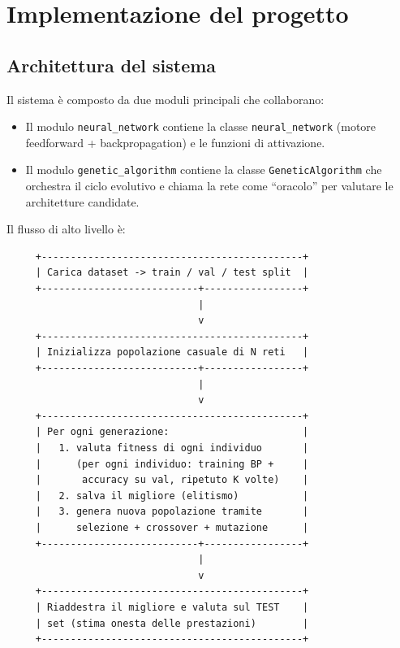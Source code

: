\documentclass[11pt,a4paper]{article}
\begin{document}
\newpage

\section{Implementazione del progetto}

\subsection{Architettura del sistema}

Il sistema è composto da due moduli principali che collaborano:

\begin{itemize}
    \item Il modulo \texttt{neural\_network} contiene la classe
          \texttt{neural\_network} (motore feedforward + backpropagation)
          e le funzioni di attivazione.
    \item Il modulo \texttt{genetic\_algorithm} contiene la classe
          \texttt{GeneticAlgorithm} che orchestra il ciclo evolutivo e
          chiama la rete come ``oracolo'' per valutare le architetture
          candidate.
\end{itemize}

Il flusso di alto livello è:

\begin{verbatim}
     +---------------------------------------------+
     | Carica dataset -> train / val / test split  |
     +---------------------------+-----------------+
                                 |
                                 v
     +---------------------------------------------+
     | Inizializza popolazione casuale di N reti   |
     +---------------------------+-----------------+
                                 |
                                 v
     +---------------------------------------------+
     | Per ogni generazione:                       |
     |   1. valuta fitness di ogni individuo       |
     |      (per ogni individuo: training BP +     |
     |       accuracy su val, ripetuto K volte)    |
     |   2. salva il migliore (elitismo)           |
     |   3. genera nuova popolazione tramite       |
     |      selezione + crossover + mutazione      |
     +---------------------------+-----------------+
                                 |
                                 v
     +---------------------------------------------+
     | Riaddestra il migliore e valuta sul TEST    |
     | set (stima onesta delle prestazioni)        |
     +---------------------------------------------+
\end{verbatim}
\end{document}
